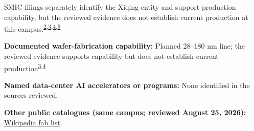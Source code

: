 \begin{minipage}[t][0.90\textheight][t]{\textwidth}
\begin{minipage}[t]{\textwidth}
\begin{minipage}[t]{0.32\textwidth}
\medskip
{\footnotesize SMIC filings separately identify the Xiqing entity and support production capability, but the reviewed evidence does not establish current production at this campus.\nobreak\textsuperscript{\href{\detokenize{https://www1.hkexnews.hk/listedco/listconews/sehk/2026/0408/2026040801181.pdf}}{\textcolor{accent}{2}},\href{\detokenize{https://www1.hkexnews.hk/listedco/listconews/sehk/2022/0826/2022082601080.pdf}}{\textcolor{accent}{3}},\href{\detokenize{https://www1.hkexnews.hk/listedco/listconews/sehk/2026/0408/2026040802776_c.pdf}}{\textcolor{accent}{4}},\href{\detokenize{https://www.hkexnews.hk/listedco/listconews/sehk/2026/0326/2026032601650_c.pdf}}{\textcolor{accent}{5}}}\par}
\medskip
{\footnotesize\textbf{Documented wafer-fabrication capability:} Planned 28--180 nm line; the reviewed evidence supports capability but does not establish current production\nobreak\textsuperscript{\href{\detokenize{https://www1.hkexnews.hk/listedco/listconews/sehk/2022/0826/2022082601080.pdf}}{\textcolor{accent}{3}},\href{\detokenize{https://www1.hkexnews.hk/listedco/listconews/sehk/2026/0408/2026040802776_c.pdf}}{\textcolor{accent}{4}}}\par}
\end{minipage}
\end{minipage}
\par\vspace{0.65em}
\medskip
{\footnotesize\textbf{Named data-center AI accelerators or programs:} None identified in the sources reviewed.\par}
\smallskip
{\sffamily\scriptsize\color{black!62}\textbf{Other public catalogues (same campus; reviewed August 25, 2026):} \href{\detokenize{https://en.wikipedia.org/w/index.php?title=List_of_semiconductor_fabrication_plants&oldid=1370451124}\#\detokenize{Open_plants}}{Wikipedia fab list}.\par}
\medskip

\end{minipage}
